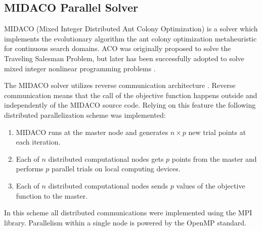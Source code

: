 \documentclass{svproc}
\begin{document}
\subsection{MIDACO Parallel Solver}
MIDACO (Mixed Integer Distributed Ant Colony Optimization) \cite{Schlueter2012} is a solver
which implements the evolutionary algorithm the ant colony optimization metaheuristic
for continuous search domains. ACO was originally
proposed to solve the Traveling Salesman Problem, but later has been successfully adopted to solve mixed integer nonlinear
programming problems \cite{SCHLUTER2009}.

The MIDACO solver utilizes reverse communication architecture \cite{Schlueter2012}.
Reverse communication means that the call of the objective function happens outside and
independently of the MIDACO source code.
Relying on this feature the following distributed parallelization scheme was implemented:
\begin{enumerate}
  \item MIDACO runs at the master node and generates \(n \times p\) new trial points at each
iteration.
  \item Each of \(n\) distributed computational nodes gets \(p\) points from the master and performs
\(p\) parallel trials on local computing devices.
  \item Each of \(n\) distributed computational nodes sends \(p\) values of the objective function to
the master.
\end{enumerate}

In this scheme all distributed communications were implemented using the MPI library.
Parallelism within a single node is powered by the OpenMP standard.
\end{document}
